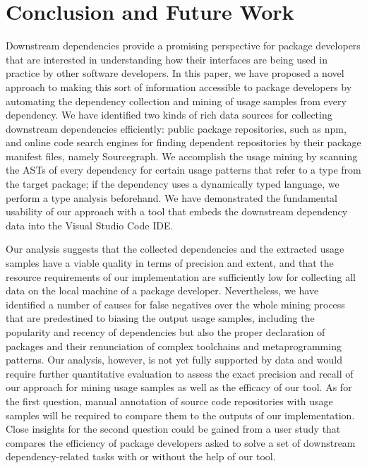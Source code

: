 \section{Conclusion and Future Work}
\label{sec:conclusion}

Downstream dependencies provide a promising perspective for package developers that are interested in understanding how their interfaces are being used in practice by other software developers.
In this paper, we have proposed a novel approach to making this sort of information accessible to package developers by automating the dependency collection and mining of usage samples from every dependency.
We have identified two kinds of rich data sources for collecting downstream dependencies efficiently: public package repositories, such as npm, and online code search engines for finding dependent repositories by their package manifest files, namely Sourcegraph.
We accomplish the usage mining by scanning the ASTs of every dependency for certain usage patterns that refer to a type from the target package; if the dependency uses a dynamically typed language, we perform a type analysis beforehand.
We have demonstrated the fundamental usability of our approach with a tool that embeds the downstream dependency data into the Visual Studio Code IDE.

Our analysis suggests that the collected dependencies and the extracted usage samples have a viable quality in terms of precision and extent, and that the resource requirements of our implementation are sufficiently low for collecting all data on the local machine of a package developer.
Nevertheless, we have identified a number of causes for false negatives over the whole mining process that are predestined to biasing the output usage samples, including the popularity and recency of dependencies but also the proper declaration of packages and their renunciation of complex toolchains and metaprogramming patterns.
Our analysis, however, is not yet fully supported by data and would require further quantitative evaluation to assess the exact precision and recall of our approach for mining usage samples as well as the efficacy of our tool.
As for the first question, manual annotation of source code repositories with usage samples will be required to compare them to the outputs of our implementation.
Close insights for the second question could be gained from a user study that compares the efficiency of package developers asked to solve a set of downstream dependency-related tasks with or without the help of our tool.

